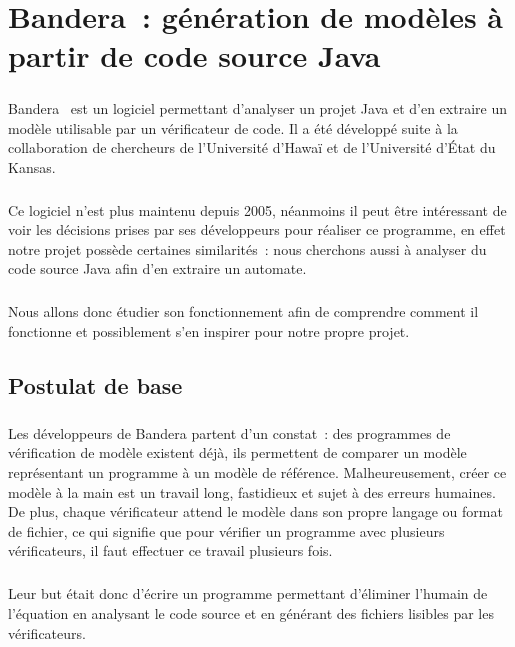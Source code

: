 \chapter{Bandera~: génération de modèles à partir de code source Java}

\paragraph{}
Bandera~\cite{bandera1} est un logiciel permettant d'analyser un
projet Java et d'en extraire un modèle utilisable par un vérificateur
de code. Il a été développé suite à la collaboration de chercheurs de
l'Université d'Hawaï et de l'Université d'État du Kansas.

\paragraph{}
Ce logiciel n'est plus maintenu depuis 2005, néanmoins il peut être
intéressant de voir les décisions prises par ses développeurs pour
réaliser ce programme, en effet notre projet possède certaines
similarités~: nous cherchons aussi à analyser du code source Java afin
d'en extraire un automate.

\paragraph{}
Nous allons donc étudier son fonctionnement afin de comprendre comment
il fonctionne et possiblement s'en inspirer pour notre propre projet.

\section{Postulat de base}

\paragraph{}
Les développeurs de Bandera partent d'un constat~: des programmes de
vérification de modèle existent déjà, ils permettent de comparer un
modèle représentant un programme à un modèle de
référence. Malheureusement, créer ce modèle à la main est un travail
long, fastidieux et sujet à des erreurs humaines. De plus, chaque
vérificateur attend le modèle dans son propre langage ou format de
fichier, ce qui signifie que pour vérifier un programme avec plusieurs
vérificateurs, il faut effectuer ce travail plusieurs fois.

\paragraph{}
Leur but était donc d'écrire un programme permettant d'éliminer
l'humain de l'équation en analysant le code source et en générant des
fichiers lisibles par les vérificateurs.

